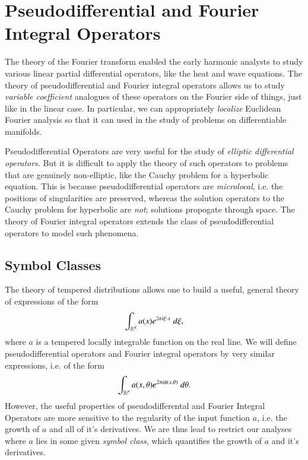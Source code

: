 
\part{Pseudodifferential and Fourier Integral Operators}

The theory of the Fourier transform enabled the early harmonic analysts to study various linear partial differential operators, like the heat and wave equations. The theory of pseudodifferential and Fourier integral operators allows us to study \emph{variable coefficient} analogues of these operators on the Fourier side of things, just like in the linear case. In particular, we can appropriately \emph{localize} Euclidean Fourier analysis so that it can used in the study of problems on differentiable manifolds.

Pseudodifferential Operators are very useful for the study of \emph{elliptic differential operators}. But it is difficult to apply the theory of such operators to problems that are genuinely non-elliptic, like the Cauchy problem for a hyperbolic equation. This is because pseudodifferential operators are \emph{microlocal}, i.e. the positions of singularities are preserved, whereas the solution operators to the Cauchy problem for hyperbolic are \emph{not}; solutions propogate through space. The theory of Fourier integral operators extends the class of pseudodifferential operators to model such phenomena.



\chapter{Symbol Classes}

The theory of tempered distributions allows one to build a useful, general theory of expressions of the form
%
\[ \int_{\operatorname{\mathbb{R}}^d} a(x) e^{2 \pi i \xi \cdot x}\; d\xi, \]
%
where $a$ is a tempered locally integrable function on the real line. We will define pseudodifferential operators and Fourier integral operators by very similar expressions, i.e. of the form
%
\[ \int_{\operatorname{\mathbb{R}}^p} a(x,\theta) e^{2 \pi i \phi(x,\theta)}\; d\theta. \]
%
However, the useful properties of pseudodifferental and Fourier Integral Operators are more sensitive to the regularity of the input function $a$, i.e. the growth of $a$ and all of it's derivatives. We are thus lead to restrict our analyses where $a$ lies in some given \emph{symbol class}, which quantifies the growth of $a$ and it's derivatives.

